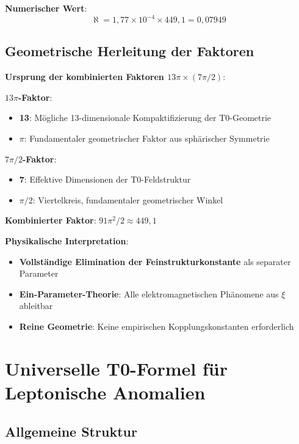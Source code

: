 \documentclass[12pt,a4paper]{article}
\newcommand{\xipar}{\xi}
\begin{document}
	\textbf{Numerischer Wert}:
	\begin{equation}
		\aleph = 1{,}77 \times 10^{-4} \times 449{,}1 = 0{,}07949
	\end{equation}
	
	\subsection{Geometrische Herleitung der Faktoren}
	
	\textbf{Ursprung der kombinierten Faktoren $13\pi \times (7\pi/2)$}:
	
	\textbf{$13\pi$-Faktor}:
	\begin{itemize}
		\item \textbf{13}: M\"ogliche 13-dimensionale Kompaktifizierung der T0-Geometrie
		\item \textbf{$\pi$}: Fundamentaler geometrischer Faktor aus sph\"arischer Symmetrie
	\end{itemize}
	
	\textbf{$7\pi/2$-Faktor}:
	\begin{itemize}
		\item \textbf{7}: Effektive Dimensionen der T0-Feldstruktur
		\item \textbf{$\pi/2$}: Viertelkreis, fundamentaler geometrischer Winkel
	\end{itemize}
	
	\textbf{Kombinierter Faktor}: $91\pi^2/2 \approx 449{,}1$
	
	\textbf{Physikalische Interpretation}:
	\begin{itemize}
		\item \textbf{Vollst\"andige Elimination der Feinstrukturkonstante} als separater Parameter
		\item \textbf{Ein-Parameter-Theorie}: Alle elektromagnetischen Ph\"anomene aus $\xipar$ ableitbar
		\item \textbf{Reine Geometrie}: Keine empirischen Kopplungskonstanten erforderlich
	\end{itemize}
	
	\section{Universelle T0-Formel f\"ur Leptonische Anomalien}
	
	\subsection{Allgemeine Struktur}
	
\end{document}
